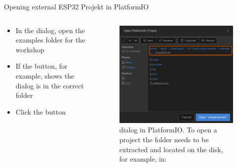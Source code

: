 \documentclass[aspectratio=169]{beamer}
\begin{document}
\begin{frame}{Opening external ESP32 Projekt in PlatformIO}
\begin{columns}
	\begin{column}{0.5\textwidth}
		\begin{textBox}
			\begin{itemize}
				\item In the  dialog, open the examples folder for the workshop
				\item If the  button, for example, shows  the dialog is in the correct folder
				\item Click the  button
			\end{itemize}
		\end{textBox}
	\end{column}
	\begin{column}{0.5\textwidth}
		\begin{figure}
  			\includegraphics[height=0.7\textheight,keepaspectratio=true]{assets/pictures/pio-project-5.png}
  			\caption{ dialog in PlatformIO. To open a project the folder needs to be extracted and located on the disk, for example, in: }
  			\label{fig:pio-project5}
		\end{figure}
	\end{column}
\end{columns}
\end{frame}
\end{document}
